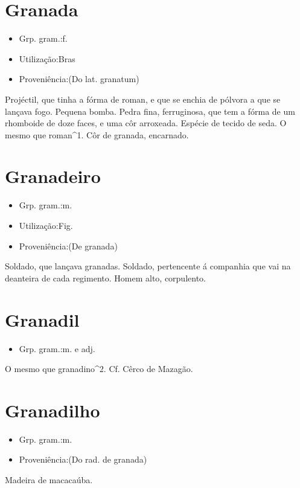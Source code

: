 \section{Granada}
\begin{itemize}
\item {Grp. gram.:f.}
\end{itemize}
\begin{itemize}
\item {Utilização:Bras}
\end{itemize}
\begin{itemize}
\item {Proveniência:(Do lat. \textunderscore granatum\textunderscore )}
\end{itemize}
Projéctil, que tinha a fórma de roman, e que se enchia de pólvora a que se lançava fogo.
Pequena bomba.
Pedra fina, ferruginosa, que tem a fórma de um rhomboide de doze faces, e uma côr arroxeada.
Espécie de tecido de seda.
O mesmo que \textunderscore roman\textunderscore ^1.
\textunderscore Côr de granada\textunderscore , encarnado.
\section{Granadeiro}
\begin{itemize}
\item {Grp. gram.:m.}
\end{itemize}
\begin{itemize}
\item {Utilização:Fig.}
\end{itemize}
\begin{itemize}
\item {Proveniência:(De \textunderscore granada\textunderscore )}
\end{itemize}
Soldado, que lançava granadas.
Soldado, pertencente á companhia que vai na deanteira de cada regimento.
Homem alto, corpulento.
\section{Granadil}
\begin{itemize}
\item {Grp. gram.:m. e adj.}
\end{itemize}
O mesmo que \textunderscore granadino\textunderscore ^2. Cf. \textunderscore Cêrco de Mazagão\textunderscore .
\section{Granadilho}
\begin{itemize}
\item {Grp. gram.:m.}
\end{itemize}
\begin{itemize}
\item {Proveniência:(Do rad. de \textunderscore granada\textunderscore )}
\end{itemize}
Madeira de macacaúba.
